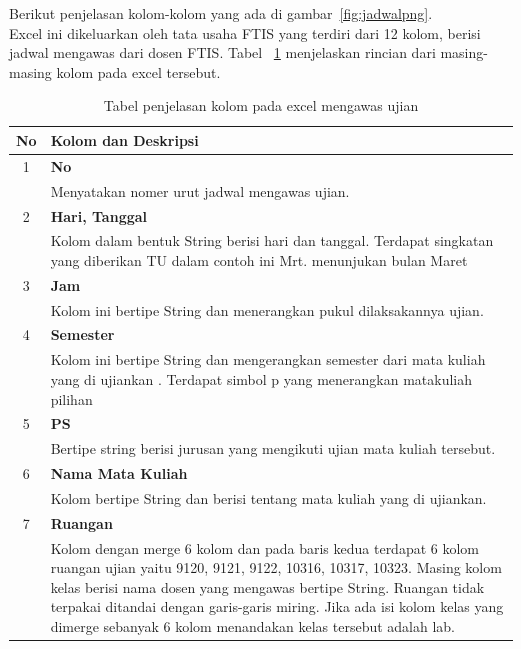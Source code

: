 Berikut penjelasan kolom-kolom yang ada di gambar~\ref{fig:jadwalpng}.\\
Excel ini dikeluarkan oleh tata usaha FTIS yang terdiri dari 12 kolom, berisi jadwal mengawas dari dosen FTIS.
Tabel ~\ref{tab:penjelasan_kolom} menjelaskan rincian dari masing-masing kolom pada excel tersebut. 
\begin{table}[H]
		\centering
		\caption{Tabel penjelasan kolom pada excel mengawas ujian}
		\label{tab:penjelasan_kolom}
\begin{tabular}{|c|p{12cm}|}
		\hline
		\textbf{No} & \textbf{Kolom dan Deskripsi} \\ \hline \hline
		1 & \textbf{No}\\
			&	Menyatakan nomer urut jadwal mengawas ujian.\\ \hline
		2 & \textbf{Hari, Tanggal}\\
			&	Kolom dalam bentuk String berisi hari dan tanggal. Terdapat singkatan yang diberikan TU dalam contoh ini  Mrt. menunjukan bulan Maret\\ \hline	
		3 & \textbf{Jam}\\
			&	Kolom ini bertipe String dan menerangkan pukul dilaksakannya ujian.\\ \hline
		4 & \textbf{Semester}\\
			&	Kolom ini bertipe String dan mengerangkan semester dari mata kuliah yang di ujiankan . Terdapat simbol p yang menerangkan matakuliah pilihan\\ \hline
		5 & \textbf{PS}\\
			&	Bertipe string berisi jurusan yang mengikuti ujian mata kuliah tersebut.\\ \hline
		6 & \textbf{Nama Mata Kuliah}\\
			&	Kolom bertipe String dan berisi tentang mata kuliah yang di ujiankan.\\ \hline
		7 & \textbf{Ruangan}\\
			&	Kolom dengan merge 6 kolom dan pada baris kedua terdapat 6 kolom ruangan ujian yaitu 9120, 9121, 9122, 10316, 10317, 10323. Masing kolom kelas berisi nama dosen yang mengawas bertipe String. Ruangan tidak terpakai ditandai dengan garis-garis miring. Jika ada isi kolom kelas yang dimerge sebanyak 6 kolom menandakan kelas tersebut adalah lab.\\ \hline
	\end{tabular}	
\end{table}

